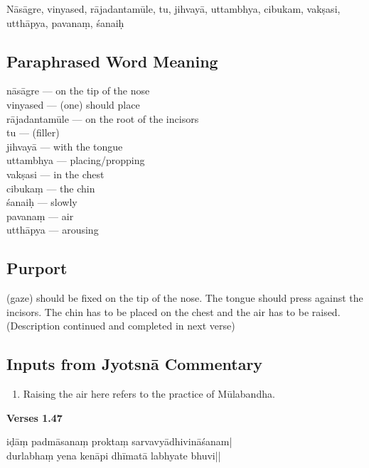 Nāsāgre, vinyased, rājadantamūle, tu, jihvayā, uttambhya, cibukam, vakṣasi, utthāpya, pavanaṃ, śanaiḥ

\subsection*{Paraphrased Word Meaning}

\begin{multicols}{2}
nāsāgre ---  on the tip of the nose \\
vinyased --- (one) should place  \\
rājadantamūle ---  on the root of the incisors   \\
tu --- (filler)  \\
jihvayā --- with the tongue \\
uttambhya ---  placing/propping \\
vakṣasi --- in the chest  \\
cibukaṃ ---  the chin  \\
śanaiḥ --- slowly  \\
pavanaṃ ---   air  \\
utthāpya --- arousing
\end{multicols}

\subsection*{Purport}

(gaze) should be fixed on the tip of the nose. The tongue should press against the incisors. The chin has to be placed on the chest and the air has to be raised. (Description continued and completed in next verse)

\subsection*{Inputs from Jyotsnā Commentary}

\begin{enumerate}
\item Raising the air here refers to the practice of Mūlabandha.   
\end{enumerate}

\newpage
\noindent \textbf{Verses 1.47}

\begin{shloka}
iḍāṃ padmāsanaṃ proktaṃ sarvavyādhivināśanam|\\
durlabhaṃ yena kenāpi dhīmatā labhyate bhuvi||
\end{shloka}

